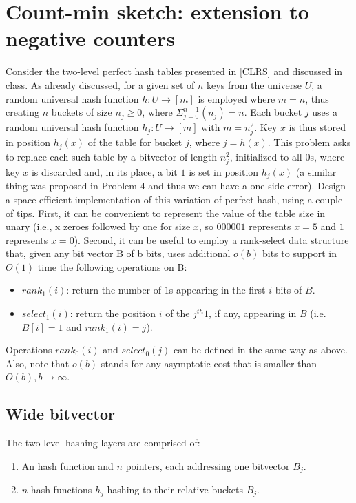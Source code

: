 \section{Count-min sketch: extension to negative counters}

Consider the two-level perfect hash tables presented in [CLRS] and discussed in class.
As already discussed, for a given set of $n$ keys from the universe $U$, a random
universal hash function $h : U \to [m]$ is employed where $m = n$, thus creating
$n$ buckets of size $n_j \geq 0$, where $\Sigma_{j=0}^{n-1}(n_j) = n$.
Each bucket $j$ uses a random universal hash function $h_j: U \to [m]$ with
$m = n_j^2$.
Key $x$ is thus stored in position $h_j(x)$ of the table for bucket $j$, where
$j = h(x)$.
This problem asks to replace each such table by a bitvector of length $n_j^2$,
initialized to all $0$s, where key $x$ is discarded and, in its place, a bit $1$
is set in position $h_j(x)$ (a similar thing was proposed in Problem 4 and thus
we can have a one-side error).
Design a space-efficient implementation of this variation of perfect hash, using
a couple of tips.
First, it can be convenient to represent the value of the table size in unary
(i.e., x zeroes followed by one for size $x$, so $000001$ represents $x = 5$ and
$1$ represents $x = 0$).
Second, it can be useful to employ a rank-select data structure that, given any
bit vector B of b bits, uses additional $o(b)$ bits to support in $O(1)$ time the
following operations on B:
\begin{itemize}
\item $rank_1(i)$: return the number of $1$s appearing in the first $i$ bits of $B$.
\item $select_1(i)$: return the position $i$ of the $j^{th} 1$, if any, appearing
in $B$ (i.e. $B[i] = 1$ and $rank_1(i) = j$).
\end{itemize}

Operations $rank_0(i)$ and $select_0(j)$ can be defined in the same way as above.
Also, note that $o(b)$ stands for any asymptotic cost that is smaller than
\\ $O(b), b \to \infty$.

\subsection{Wide bitvector}

The two-level hashing layers are comprised of:
\begin{enumerate}
\item An hash function and $n$ pointers, each addressing one bitvector $B_j$.
\item $n$ hash functions $h_j$ hashing to their relative buckets $B_j$.
\end{enumerate}

